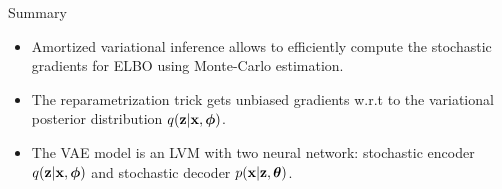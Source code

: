 	\begin{frame}{Summary}
		\begin{itemize}
			\item Amortized variational inference allows to efficiently compute the stochastic gradients for ELBO using Monte-Carlo estimation.
			\vfill
			\item The reparametrization trick gets unbiased gradients w.r.t to the variational posterior distribution $q(\mathbf{z} | \mathbf{x}, \boldsymbol{\phi})$.
			\vfill
			\item The VAE model is an LVM with two neural network: stochastic encoder $q(\mathbf{z} | \mathbf{x}, \boldsymbol{\phi})$ and stochastic decoder $p(\mathbf{x} | \mathbf{z}, \boldsymbol{\theta})$.
		\end{itemize}
	\end{frame}
 